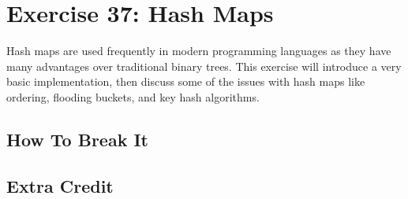 \chapter{Exercise 37: Hash Maps}

Hash maps are used frequently in modern programming languages as they have many advantages
over traditional binary trees.  This exercise will introduce a very basic implementation,
then discuss some of the issues with hash maps like ordering, flooding buckets, and 
key hash algorithms.



\section{How To Break It}


\section{Extra Credit}




